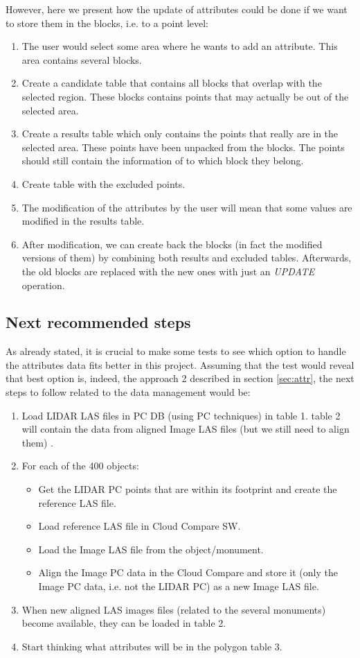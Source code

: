 \documentclass[a4paper,11pt]{article}
\begin{document}
However, here we present how the update of attributes could be done if we want to store them in the blocks, i.e. to a point level:

\begin{enumerate}
	\item The user would select some area where he wants to add an attribute. This area contains several blocks.
	\item Create a candidate table that contains all blocks that overlap with the selected region. These blocks contains points that may actually be out of the selected area.
	\item Create a results table which only contains the points that really are in the selected area. These points have been unpacked from the blocks. The points should still contain the information of to which block they belong.
	\item Create table with the excluded points.
	\item The modification of the attributes by the user will mean that some values are modified in the results table.
	\item After modification, we can create back the blocks (in fact the modified versions of them) by combining both results and excluded tables. Afterwards, the old blocks are replaced with the new ones with just an \textit{UPDATE} operation.
\end{enumerate}

\subsection{Next recommended steps}

As already stated, it is crucial to make some tests to see which option to handle the attributes data fits better in this project. Assuming that the test would reveal that best option is, indeed, the approach 2 described in section \ref{sec:attr}, the next steps to follow related to the data management would be:

\begin{enumerate}
	\item Load LIDAR LAS files in PC DB (using PC techniques) in table 1. table 2 will contain the data from aligned Image LAS files (but we still need to align them) .
	\item For each of the 400 objects:
	\begin{itemize}
		\item Get the LIDAR PC points that are within its footprint and create the reference LAS file.
		\item Load reference LAS file in Cloud Compare SW. 
		\item Load the Image LAS file from the object/monument.
		\item Align the Image PC data in the Cloud Compare and store it (only the Image PC data, i.e. not the LIDAR PC) as a new Image LAS file.
	\end{itemize}
	\item When new aligned LAS images files (related to the several monuments) become available, they can be loaded in table 2.
	\item Start thinking what attributes will be in the polygon table 3.
\end{enumerate}
\end{document}
